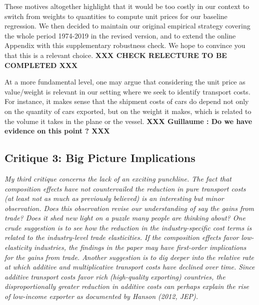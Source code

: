 \documentclass[a4paper,11pt]{article}
\begin{document}
\begin{itemize}
\begin{enumerate}
\begin{table}[htbp]
These motives altogether highlight that it would be too costly in our context to switch from weights to quantities to compute unit prices for our baseline regression. We then decided to maintain our original empirical strategy covering the whole period 1974-2019 in the revised version, and to extend the online Appendix with this supplementary robustness check. We hope to convince you that this is a relevant choice. \textbf{XXX CHECK RELECTURE TO BE COMPLETED XXX}

At a more fundamental level, one may argue that considering the unit price as value/weight is relevant in our setting where we seek to identify transport costs. For instance, it makes sense that the shipment costs of cars do depend not only on the quantity of cars exported, but on the weight it makes, which is related to the volume it takes in the plane or the vessel. \textbf{XXX Guillaume : Do we have evidence on this point ? XXX}




\subsection{Critique 3: Big Picture Implications}

\textit{My third critique concerns the lack of an exciting punchline. The fact that
composition effects have not countervailed the reduction in pure transport costs
(at least not as much as previously believed) is an interesting but minor observation.
Does this observation revise our understanding of say the gains from
trade? Does it shed new light on a puzzle many people are thinking about?
One crude suggestion is to see how the reduction in the industry-specific cost
terms is related to the industry-level trade elasticities. If the composition effects
favor low-elasticity industries, the findings in the paper may have first-order
implications for the gains from trade.
Another suggestion is to dig deeper into the relative rate at which additive
and multiplicative transport costs have declined over time. Since additive transport
costs favor rich (high-quality exporting) countries, the disproportionally
greater reduction in additive costs can perhaps explain the rise of low-income
exporter as documented by Hanson (2012, JEP).}


\end{table}
\end{enumerate}
\end{itemize}
\end{document}
